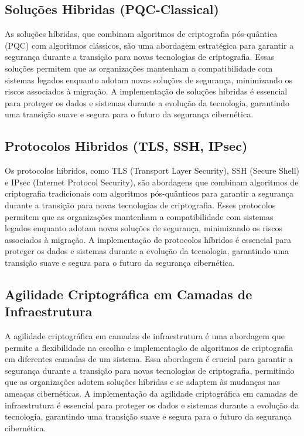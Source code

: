         \subsection{Soluções Hibridas (PQC-Classical)} %
            As soluções híbridas, que combinam algoritmos de criptografia pós-quântica (PQC) com algoritmos clássicos, são uma abordagem estratégica para garantir a segurança durante a transição para novas tecnologias de criptografia.
            Essas soluções permitem que as organizações mantenham a compatibilidade com sistemas legados enquanto adotam novas soluções de segurança, minimizando os riscos associados à migração.
            A implementação de soluções híbridas é essencial para proteger os dados e sistemas durante a evolução da tecnologia, garantindo uma transição suave e segura para o futuro da segurança cibernética.
        \subsection{Protocolos Hibridos (TLS, SSH, IPsec)} %
            Os protocolos híbridos, como TLS (Transport Layer Security), SSH (Secure Shell) e IPsec (Internet Protocol Security), são abordagens que combinam algoritmos de criptografia tradicionais com algoritmos pós-quânticos para garantir a segurança durante a transição para novas tecnologias de criptografia.
            Esses protocolos permitem que as organizações mantenham a compatibilidade com sistemas legados enquanto adotam novas soluções de segurança, minimizando os riscos associados à migração.
            A implementação de protocolos híbridos é essencial para proteger os dados e sistemas durante a evolução da tecnologia, garantindo uma transição suave e segura para o futuro da segurança cibernética.
        \subsection{Agilidade Criptográfica em Camadas de Infraestrutura} %
            A agilidade criptográfica em camadas de infraestrutura é uma abordagem que permite a flexibilidade na escolha e implementação de algoritmos de criptografia em diferentes camadas de um sistema.
            Essa abordagem é crucial para garantir a segurança durante a transição para novas tecnologias de criptografia, permitindo que as organizações adotem soluções híbridas e se adaptem às mudanças nas ameaças cibernéticas.
            A implementação da agilidade criptográfica em camadas de infraestrutura é essencial para proteger os dados e sistemas durante a evolução da tecnologia, garantindo uma transição suave e segura para o futuro da segurança cibernética.

